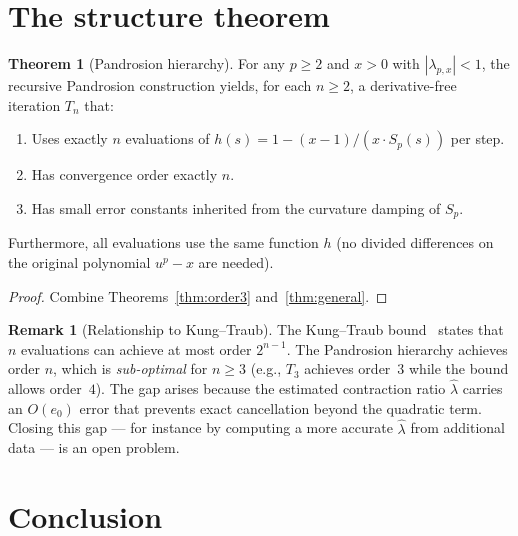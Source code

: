 \documentclass[11pt,a4paper]{article}
\theoremstyle{definition}
\newtheorem{theorem}{Theorem}[section]
\newtheorem{remark}{Remark}[section]
\begin{document}
\section{The structure theorem}
\label{sec:structure}

\begin{theorem}[Pandrosion hierarchy]
\label{thm:hierarchy}
For any $p \geq 2$ and $x > 0$ with $|{\lambda_{p,x}}| < 1$, the recursive Pandrosion construction yields, for each $n \geq 2$, a derivative-free iteration $T_n$ that:
\begin{enumerate}
  \item Uses exactly $n$ evaluations of $h(s) = 1 - (x-1)/(x \cdot S_p(s))$ per step.
  \item Has convergence order exactly $n$.
  \item Has small error constants inherited from the curvature damping of $S_p$.
\end{enumerate}
Furthermore, all evaluations use the same function $h$ (no divided differences on the original polynomial $u^p - x$ are needed).
\end{theorem}

\begin{proof}
Combine Theorems~\ref{thm:order3} and~\ref{thm:general}.
\end{proof}

\begin{remark}[Relationship to Kung--Traub]
The Kung--Traub bound~\cite{kungtraub} states that $n$ evaluations can achieve at most order $2^{n-1}$.  The Pandrosion hierarchy achieves order $n$, which is \emph{sub-optimal} for $n \geq 3$ (e.g., $T_3$ achieves order~$3$ while the bound allows order~$4$).  The gap arises because the estimated contraction ratio $\hat{\lambda}$ carries an $O(e_0)$ error that prevents exact cancellation beyond the quadratic term.  Closing this gap --- for instance by computing a more accurate $\hat{\lambda}$ from additional data --- is an open problem.
\end{remark}

\section{Conclusion}
\label{sec:conclusion}
\end{document}
